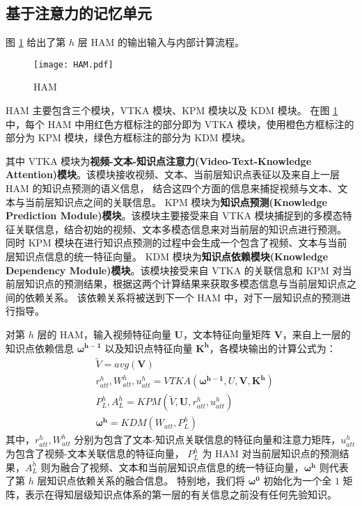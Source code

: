 \subsection{基于注意力的记忆单元}
    图 \ref{fig3.2} 给出了第 $h$ 层 HAM 的输出输入与内部计算流程。

    \begin{figure}[t]
        \centering
        \texttt{[image: HAM.pdf]}
        \caption{HAM}
        \label{fig3.2}
    \end{figure}

    HAM 主要包含三个模块，VTKA 模块、KPM 模块以及 KDM 模块。
    在图 \ref{fig3.2} 中，每个 HAM 中用红色方框标注的部分即为 VTKA 模块，使用橙色方框标注的部分为 KPM 模块，绿色方框标注的部分为 KDM 模块。

    其中 VTKA 模块为\textbf{视频-文本-知识点注意力(Video-Text-Knowledge Attention)模块}。该模块接收视频、文本、当前层知识点表征以及来自上一层 HAM 的知识点预测的语义信息，
    结合这四个方面的信息来捕捉视频与文本、文本与当前层知识点之间的关联信息。
    KPM 模块为\textbf{知识点预测(Knowledge Prediction Module)模块}。该模块主要接受来自 VTKA 模块捕捉到的多模态特征关联信息，结合初始的视频、文本多模态信息来对当前层的知识点进行预测。
    同时 KPM 模块在进行知识点预测的过程中会生成一个包含了视频、文本与当前层知识点信息的统一特征向量。
    KDM 模块为\textbf{知识点依赖模块(Knowledge Dependency Module)模块}。该模块接受来自 VTKA 的关联信息和 KPM 对当前层知识点的预测结果，根据这两个计算结果来获取多模态信息与当前层知识点之间的依赖关系。
    该依赖关系将被送到下一个 HAM 中，对下一层知识点的预测进行指导。

    对第 $h$ 层的 HAM，输入视频特征向量 $\boldsymbol{U}$，文本特征向量矩阵 $\boldsymbol{V}$，来自上一层的知识点依赖信息 $\boldsymbol{\omega^{h - 1}}$ 以及知识点特征向量 $\boldsymbol{K^h}$，各模块输出的计算公式为：
    \begin{equation}
        \begin{aligned}
            &\tilde{V} = avg\left(\boldsymbol{V}\right) \\
            &r_{att}^h, W_{att}^h, u_{att}^h = VTKA\left(\boldsymbol{\omega^{h - 1}}, U, \boldsymbol{V}, \boldsymbol{K^h}\right) \\
            &P_L^h, A_L^h = KPM\left(\tilde{V}, \boldsymbol{U}, r_{att}^h, u_{att}^h\right) \\
            &\boldsymbol{\omega^h} = KDM\left(W_{att}, P_L^h\right)
        \end{aligned}
    \end{equation}
    其中，$r_{att}^{h}, W_{att}^h$ 分别为包含了文本-知识点关联信息的特征向量和注意力矩阵，$u_{att}^h$ 为包含了视频-文本关联信息的特征向量，
    $P_L^h$ 为 HAM 对当前层知识点的预测结果，$A_L^h$ 则为融合了视频、文本和当前层知识点信息的统一特征向量，$\boldsymbol{\omega^h}$ 则代表了第 $h$ 层知识点依赖关系的融合信息。
    特别地，我们将 $\boldsymbol{\omega^0}$ 初始化为一个全 $1$ 矩阵，表示在得知层级知识点体系的第一层的有关信息之前没有任何先验知识。

